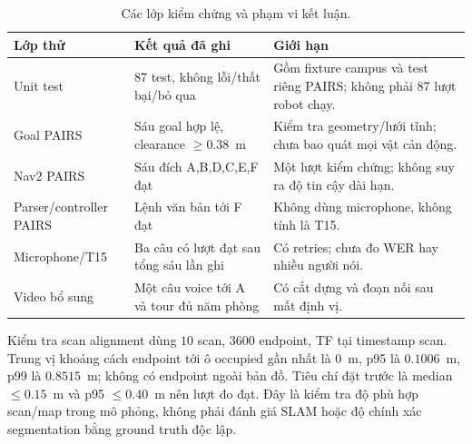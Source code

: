\documentclass[12pt,a4paper]{article}
\begin{document}
\begin{table}[H]
\centering\small
\caption{Các lớp kiểm chứng và phạm vi kết luận.}
\begin{tabularx}{\linewidth}{@{}lYY@{}}
\toprule
Lớp thử & Kết quả đã ghi & Giới hạn \\
\midrule
Unit test & 87 test, không lỗi/thất bại/bỏ qua & Gồm fixture campus và test riêng PAIRS; không phải 87 lượt robot chạy. \\
Goal PAIRS & Sáu goal hợp lệ, clearance $\geq0.38$~m & Kiểm tra geometry/lưới tĩnh; chưa bao quát mọi vật cản động. \\
Nav2 PAIRS & Sáu đích A,B,D,C,E,F đạt & Một lượt kiểm chứng; không suy ra độ tin cậy dài hạn. \\
Parser/controller PAIRS & Lệnh văn bản tới F đạt & Không dùng microphone, không tính là T15. \\
Microphone/T15 & Ba câu có lượt đạt sau tổng sáu lần ghi & Có retries; chưa đo WER hay nhiều người nói. \\
Video bổ sung & Một câu voice tới A và tour đủ năm phòng & Có cắt dựng và đoạn nối sau mất định vị. \\
\bottomrule
\end{tabularx}
\end{table}

Kiểm tra scan alignment dùng $10$ scan, $3600$ endpoint, TF tại timestamp
scan. Trung vị khoảng cách endpoint tới ô occupied gần nhất là $0$~m,
p95 là $0.1006$~m, p99 là $0.8515$~m; không có endpoint ngoài bản đồ.
Tiêu chí đặt trước là median $\leq0.15$~m và p95 $\leq0.40$~m nên lượt
đo đạt. Đây là kiểm tra độ phù hợp scan/map trong mô phỏng, không phải
đánh giá SLAM hoặc độ chính xác segmentation bằng ground truth độc lập.
\end{document}

